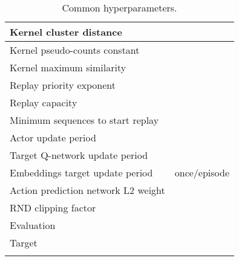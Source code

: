 \documentclass{article} \usepackage{iclr2020_conference,times}
\begin{document}
\begin{small}
\begin{longtable}[h!]{l|c}
Kernel cluster distance  &  \\ \hline
Kernel pseudo-counts constant  &  \\ \hline
Kernel maximum similarity  &  \\ \hline
Replay priority exponent &  \\ \hline 
Replay capacity &  \\ \hline 
Minimum sequences to start replay &  \\ \hline 
Actor update period &  \\ \hline
Target Q-network update period &  \\ \hline
Embeddings target update period & once/episode \\ \hline
Action prediction network L2 weight &  \\ \hline
RND clipping factor  &  \\ \hline
Evaluation  &  \\ \hline
Target  &  \\ \hline

\caption{Common hyperparameters.}
\label{table_hyper_montezuma_common}
\vspace{-2ex}
\end{longtable}
\end{small}
\end{document}
